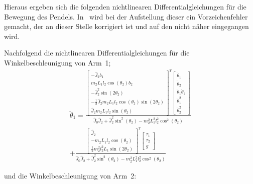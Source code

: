 Hieraus ergeben sich die folgenden nichtlinearen Differentialgleichungen für die Bewegung des Pendels. 
In~\cite{Cazzolato.2011} wird bei der Aufstellung dieser ein Vorzeichenfehler gemacht, der an dieser Stelle korrigiert ist und auf den nicht näher eingegangen wird.


Nachfolgend die nichtlinearen Differentialgleichungen für die Winkelbeschleunigung von Arm~1;
\begin{multline}
\ddot{\theta}_1 =
\frac{
\begin{bmatrix}
	-\hat{J}_2b_1 \\ 
	m_2L_1l_2\cos(\theta_2)b_2 \\ 
	-\hat{J}^2_2\sin(2\theta_2) \\ 
	-\frac{1}{2}\hat{J}_2m_2L_1l_2\cos(\theta_2)\sin(2\theta_2) \\ 
	\hat{J}_2m_2L_1l_2\sin(\theta_2)
\end{bmatrix}^T
\begin{bmatrix}
	\dot{\theta}_1 \\ 
	\dot{\theta}_2 \\ 
	\dot{\theta}_1\dot{\theta}_2 \\ 
	\dot{\theta}^2_1 \\ 
	\dot{\theta}^2_2
\end{bmatrix} }
{\hat{J}_0\hat{J}_2+\hat{J}^2_2\sin^2(\theta_2)-m^2_2L^2_1l^2_2\cos^2(\theta_2)} \\ 
+
\frac{
\begin{bmatrix}
	\hat{J}_2 \\ 
	-m_2L_1l_2\cos(\theta_2) \\ 
	\frac{1}{2}m^2_2l^2_2L_1\sin(2\theta_2)
\end{bmatrix}^T
\begin{bmatrix}
	\tau_1 \\ 
	\tau_2 \\ 
	g
\end{bmatrix} }
{\hat{J}_0\hat{J}_2+\hat{J}^2_2\sin^2(\theta_2)-m^2_2L^2_1l^2_2\cos^2(\theta_2)}
\end{multline}

und die Winkelbeschleunigung von Arm~2:

